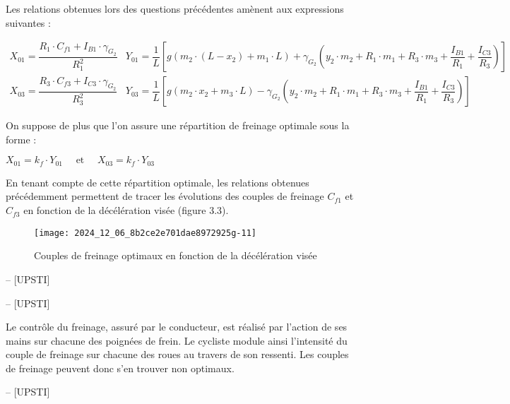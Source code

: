 Les relations obtenues lors des questions précédentes amènent aux expressions suivantes :

$
\begin{array}{ll}
X_{01}=\dfrac{R_{1} \cdot C_{f 1}+I_{B 1} \cdot \gamma_{G_{2}}}{R_{1}^{2}} & Y_{01}=\dfrac{1}{L}\left[g\left(m_{2} \cdot\left(L-x_{2}\right)+m_{1} \cdot L\right)+\gamma_{G_{2}}\left(y_{2} \cdot m_{2}+R_{1} \cdot m_{1}+R_{3} \cdot m_{3}+\dfrac{I_{B 1}}{R_{1}}+\dfrac{I_{C 3}}{R_{3}}\right)\right] \\
X_{03}=\dfrac{R_{3} \cdot C_{f 3}+I_{C 3} \cdot \gamma_{G_{2}}}{R_{3}^{2}} & Y_{03}=\dfrac{1}{L}\left[g\left(m_{2} \cdot x_{2}+m_{3} \cdot L\right)-\gamma_{G_{2}}\left(y_{2} \cdot m_{2}+R_{1} \cdot m_{1}+R_{3} \cdot m_{3}+\dfrac{I_{B 1}}{R_{1}}+\dfrac{I_{C 3}}{R_{3}}\right)\right]
\end{array}
$

On suppose de plus que l'on assure une répartition de freinage optimale sous la forme :

$
X_{01}=k_{f} \cdot Y_{01} \quad \text { et } \quad X_{03}=k_{f} \cdot Y_{03}
$

En tenant compte de cette répartition optimale, les relations obtenues précédemment permettent de tracer les évolutions des couples de freinage \(C_{f 1}\) et \(C_{f 3}\) en fonction de la décélération visée (figure 3.3).\\

\begin{figure}[!htb]
\begin{center}
\texttt{[image: 2024\_12\_06\_8b2ce2e701dae8972925g-11]}
\caption{Couples de freinage optimaux en fonction de la décélération visée \label{fig6}}
\end{center}
\end{figure}

\ifprof
\begin{corrige}-- [UPSTI]
\end{corrige}
\else
\fi

\ifprof
\begin{corrige}-- [UPSTI]
\end{corrige}
\else
\fi

Le contrôle du freinage, assuré par le conducteur, est réalisé par l'action de ses mains sur chacune des poignées de frein. Le cycliste module ainsi l'intensité du couple de freinage sur chacune des roues au travers de son ressenti. Les couples de freinage peuvent donc s'en trouver non optimaux.

\ifprof
\begin{corrige}-- [UPSTI]
\end{corrige}
\else
\fi


